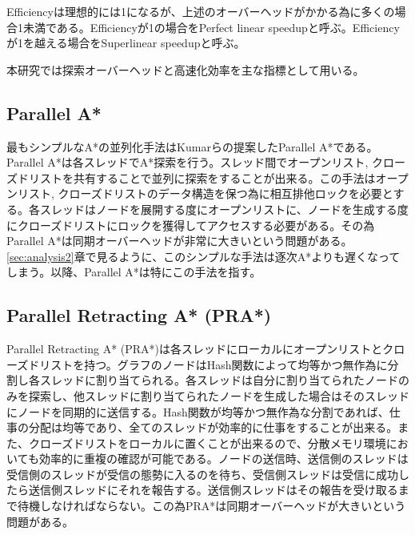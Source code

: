 \documentclass{jsarticle}
\renewcommand{\textbf}{} %
\begin{document}
Efficiencyは理想的には1になるが、上述のオーバーヘッドがかかる為に多くの場合1未満である。Efficiencyが1の場合を\textbf{Perfect linear speedup}と呼ぶ。Efficiencyが1を越える場合を\textbf{Superlinear speedup}と呼ぶ。

本研究では探索オーバーヘッドと高速化効率を主な指標として用いる。

\subsection{Parallel A*}
最もシンプルなA*の並列化手法はKumarらの提案した\textbf{Parallel A*}である\cite{Kumar1988parallel}。Parallel A*は各スレッドでA*探索を行う。スレッド間でオープンリスト, クローズドリストを共有することで並列に探索をすることが出来る。この手法はオープンリスト, クローズドリストのデータ構造を保つ為に相互排他ロックを必要とする。各スレッドはノードを展開する度にオープンリストに、ノードを生成する度にクローズドリストにロックを獲得してアクセスする必要がある。その為Parallel A*は同期オーバーヘッドが非常に大きいという問題がある。\ref{sec:analysis2}章で見るように、このシンプルな手法は逐次A*よりも遅くなってしまう。以降、Parallel A*は特にこの手法を指す。


\subsection{Parallel Retracting A* (PRA*)}
Parallel Retracting A* (PRA*)は各スレッドにローカルにオープンリストとクローズドリストを持つ\cite{evett1995massively}。グラフのノードはHash関数によって均等かつ無作為に分割し各スレッドに割り当てられる。各スレッドは自分に割り当てられたノードのみを探索し、他スレッドに割り当てられたノードを生成した場合はそのスレッドにノードを同期的に送信する。Hash関数が均等かつ無作為な分割であれば、仕事の分配は均等であり、全てのスレッドが効率的に仕事をすることが出来る。また、クローズドリストをローカルに置くことが出来るので、分散メモリ環境においても効率的に重複の確認が可能である。ノードの送信時、送信側のスレッドは受信側のスレッドが受信の態勢に入るのを待ち、受信側スレッドは受信に成功したら送信側スレッドにそれを報告する。送信側スレッドはその報告を受け取るまで待機しなければならない。この為PRA*は同期オーバーヘッドが大きいという問題がある。
\newline
\end{document}
